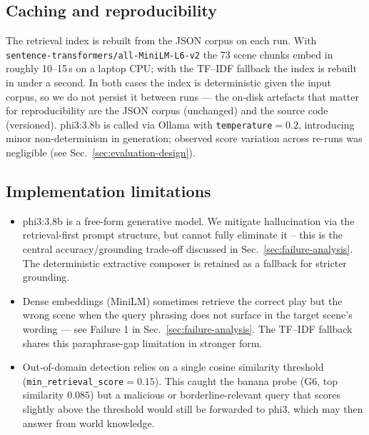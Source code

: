 \documentclass[10pt,conference]{IEEEtran}
\begin{document}
\subsection{Caching and reproducibility}

The retrieval index is rebuilt from the JSON corpus on each run.
With \verb|sentence-transformers/all-MiniLM-L6-v2| the 73 scene chunks
embed in roughly 10--15\,s on a laptop CPU; with the TF--IDF fallback
the index is rebuilt in under a second. In both cases the index is
deterministic given the input corpus, so we do not persist it
between runs --- the on-disk artefacts that matter for
reproducibility are the JSON corpus (unchanged) and the source code
(versioned). phi3:3.8b is called via Ollama with
\texttt{temperature}$=0.2$, introducing minor non-determinism in
generation; observed score variation across re-runs was negligible
(see Sec.~\ref{sec:evaluation-design}).

\subsection{Implementation limitations}

\begin{itemize}
    \item phi3:3.8b is a free-form generative model. We mitigate
        hallucination via the retrieval-first prompt structure, but
        cannot fully eliminate it -- this is the central
        accuracy/grounding trade-off discussed in
        Sec.~\ref{sec:failure-analysis}. The deterministic extractive
        composer is retained as a fallback for stricter grounding.
    \item Dense embeddings (MiniLM) sometimes retrieve the
        correct play but the wrong scene when the query phrasing
        does not surface in the target scene's wording --- see
        Failure 1 in Sec.~\ref{sec:failure-analysis}. The TF--IDF
        fallback shares this paraphrase-gap limitation in stronger
        form.
    \item Out-of-domain detection relies on a single cosine
        similarity threshold (\verb|min_retrieval_score|$=0.15$).
        This caught the banana probe (G6, top similarity $0.085$)
        but a malicious or borderline-relevant query that scores
        slightly above the threshold would still be forwarded to
        phi3, which may then answer from world knowledge.
\end{itemize}

\end{document}
